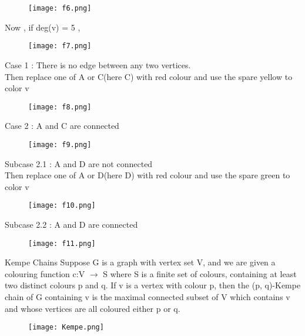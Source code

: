 \documentclass[12pt]{beamer}
\begin{document}
\begin{frame} 
\begin{figure}
\texttt{[image: f6.png]}
\end{figure}
\end{frame}

\begin{frame}
Now , if deg(v) = 5 , \\
\begin{figure}
\texttt{[image: f7.png]}
\end{figure}
\end{frame}

\begin{frame}
Case 1 : There is no edge between any two vertices.\\
Then replace one of A or C(here C) with red colour and use the spare yellow to color v

\begin{figure}
\texttt{[image: f8.png]}
\end{figure}
\end{frame}


\begin{frame}
Case 2 : A and C are connected \\

\begin{figure}
\texttt{[image: f9.png]}
\end{figure}
\end{frame}

\begin{frame}
Subcase 2.1 : A and D are not connected \\
Then replace one of A or D(here D) with red colour and use the spare green to color v

\begin{figure}
\texttt{[image: f10.png]}
\end{figure}
\end{frame}

\begin{frame}
Subcase 2.2 : A and D are connected \\

\begin{figure}
\texttt{[image: f11.png]}
\end{figure}
\end{frame}

\begin{frame}
\begin{block}{Kempe Chains}
Suppose G is a graph with vertex set V, and we are given a colouring function
c:V $\rightarrow$ S
where S is a finite set of colours, containing at least two distinct colours p and q. If v is a vertex with colour p, then the (p, q)-Kempe chain of G containing v is the maximal connected subset of V which contains v and whose vertices are all coloured either p or q.
\end{block}
\begin{figure}
\texttt{[image: Kempe.png]}
\end{figure}
\end{frame}
\end{document}
